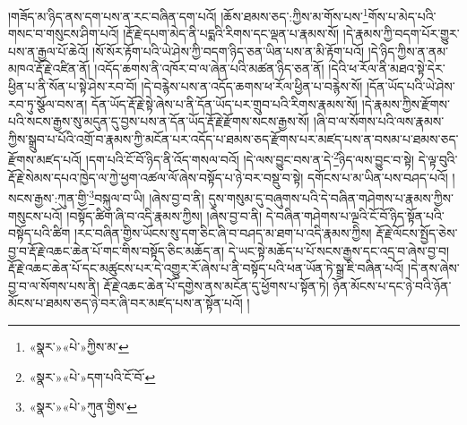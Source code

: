 །གཟོད་མ་ཉིད་ནས་དག་པས་ན་རང་བཞིན་དག་པའོ། །ཆོས་ཐམས་ཅད་:ཀྱིས་མ་གོས་པས་\footnote{«སྣར་»«པེ་»ཀྱིས་མ་}གོས་པ་མེད་པའི་གསང་བ་གསུངས་ཤིག་པའོ། །རྡོ་རྗེ་དཔག་མེད་ནི་པདྨའི་རིགས་དང་ལྡན་པ་རྣམས་སོ། །དེ་རྣམས་ཀྱི་བདག་པོར་གྱུར་པས་ན་རྒྱལ་པོ་ཆེའོ། །སོ་སོར་རྟོག་པའི་ཡེ་ཤེས་ཀྱི་བདག་ཉིད་ཅན་ཡིན་པས་ན་མི་རྟོག་པའོ། །དེ་ཉིད་ཀྱིས་ན་ནམ་མཁའ་རྡོ་རྗེ་འཛིན་ནོ། །འདོད་ཆགས་ནི་འཁོར་བ་ལ་ཞེན་པའི་མཚན་ཉིད་ཅན་ནོ། །དེའི་ཕ་རོལ་ནི་མཐའ་སྟེ་དེར་ཕྱིན་པ་ནི་སོན་པ་སྟེ་ཤེས་རབ་བོ། །དེ་བརྙེས་པས་ན་འདོད་ཆགས་ཕ་རོལ་ཕྱིན་པ་བརྙེས་སོ། །དོན་ཡོད་པའི་ཡེ་ཤེས་རབ་ཏུ་སྩོལ་བས་ན། དོན་ཡོད་རྡོ་རྗེ་སྟེ་ཞེས་པ་ནི་དོན་ཡོད་པར་གྲུབ་པའི་རིགས་རྣམས་སོ། །དེ་རྣམས་ཀྱིས་རྫོགས་པའི་སངས་རྒྱས་སུ་མདུན་དུ་བྱས་པས་ན་དོན་ཡོད་རྡོ་རྗེ་རྫོགས་སངས་རྒྱས་སོ། །ཞི་བ་ལ་སོགས་པའི་ལས་རྣམས་ཀྱིས་སྒྲུབ་པ་པོའི་འགྲོ་བ་རྣམས་ཀྱི་མངོན་པར་འདོད་པ་ཐམས་ཅད་རྫོགས་པར་མཛད་པས་ན་བསམ་པ་ཐམས་ཅད་རྫོགས་མཛད་པའོ། །དག་པའི་ངོ་བོ་ཉིད་ནི་འོད་གསལ་བའོ། །དེ་ལས་བྱུང་བས་ན་དེ་\footnote{«སྣར་»«པེ་»དག་པའི་ངོ་བོ་}ཉིད་ལས་བྱུང་བ་སྟེ། དེ་ལྟ་བུའི་རྡོ་རྗེ་སེམས་དཔའ་ཁྱེད་ལ་ཀྱེ་ཕྱག་འཚལ་ལོ་ཞེས་བསྟོད་པ་ཉེ་བར་བསྡུ་བ་སྟེ། དགོངས་པ་མ་ཡིན་པས་བཤད་པའོ། །སངས་རྒྱས་:ཀུན་གྱི་\footnote{«སྣར་»«པེ་»ཀུན་གྱིས་}བསྐུལ་བ་ཡི། །ཞེས་བྱ་བ་ནི། དུས་གསུམ་དུ་བཞུགས་པའི་དེ་བཞིན་གཤེགས་པ་རྣམས་ཀྱིས་གསུངས་པའོ། །བསྟོད་ཚིག་ཞི་བ་འདི་རྣམས་ཀྱིས། །ཞེས་བྱ་བ་ནི། དེ་བཞིན་གཤེགས་པ་ལྔའི་ངོ་བོ་ཉིད་སྟོན་པའི་བསྟོད་པའི་ཚིག །རང་བཞིན་གྱིས་ཡོངས་སུ་དག་ཅིང་ཞི་བ་བཤད་མ་ཐག་པ་འདི་རྣམས་ཀྱིས། རྡོ་རྗེ་ལོངས་སྤྱོད་ཅེས་བྱ་བ་རྡོ་རྗེ་འཆང་ཆེན་པོ་གང་གིས་བསྟོད་ཅིང་མཆོད་ན། དེ་ཡང་སྟེ་མཆོད་པ་པོ་སངས་རྒྱས་དང་འདྲ་བ་ཞེས་བྱ་བ། རྡོ་རྗེ་འཆང་ཆེན་པོ་དང་མཚུངས་པར་དེ་འགྱུར་རོ་ཞེས་པ་ནི་བསྟོད་པའི་ཕན་ཡོན་ཏེ་སྒྲ་ཇི་བཞིན་པའོ། །དེ་ནས་ཞེས་བྱ་བ་ལ་སོགས་པས་ནི། རྡོ་རྗེ་འཆང་ཆེན་པོ་དགྱེས་ནས་མངོན་དུ་ཕྱོགས་པ་སྟོན་ཏེ། ཉོན་མོངས་པ་དང་ཉེ་བའི་ཉོན་མོངས་པ་ཐམས་ཅད་ཉེ་བར་ཞི་བར་མཛད་པས་ན་སྟོན་པའོ། །
